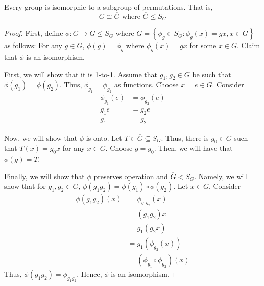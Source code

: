 \begin{theorem}
    Every group is isomorphic to a subgroup of permutations. That is,
    \[
        G \cong \overline{G} \text{ where } \overline{G} \leq S_G
    \]
\end{theorem}

\begin{proof}
    First, define \(\phi: G \to \overline{G} \leq S_G\) where \(\overline{G} = \left\{\phi_g \in S_G : \phi_g(x) = gx, x \in G\right\}\) as follows: For any \(g \in G\), \(\phi(g) = \phi_g\) where \(\phi_g(x) = gx\) for some \(x \in G\). Claim that \(\phi\) is an isomorphism.

    First, we will show that it is 1-to-1. Assume that \(g_1, g_2 \in G\) be such that \(\phi(g_1) = \phi(g_2)\). Thus, \(\phi_{g_1} = \phi_{g_2}\) as functions. Choose \(x = e \in G\). Consider
    \[
    \begin{aligned}
        \phi_{g_1}(e) &= \phi_{g_2}(e) \\
        g_1 e &= g_2 e \\
        g_1 &= g_2
    \end{aligned}
    \]

    Now, we will show that \(\phi\) is onto. Let \(T \in \overline{G} \subseteq S_G\). Thus, there is \(g_0 \in G\) such that \(T(x) = g_0 x\) for any \(x \in G\). Choose \(g = g_0\). Then, we will have that \(\phi(g) = T\).

    Finally, we will show that \(\phi\) preserves operation and \(\overline{G} < S_G\). Namely, we will show that for \(g_1, g_2 \in G\), \(\phi(g_1 g_2) = \phi(g_1) \circ \phi(g_2)\). Let \(x \in G\). Consider
    \[
    \begin{aligned}
        \phi(g_1 g_2)(x) &= \phi_{g_1 g_2}(x) \\
                         &= (g_1 g_2)x \\
                         &= g_1(g_2 x) \\
                         &= g_1(\phi_{g_2}(x)) \\
                         &= (\phi_{g_1} \circ \phi_{g_2}) (x)
    \end{aligned}
    \]
    Thus, \(\phi(g_1 g_2) = \phi_{g_1 g_2}\). Hence, \(\phi\) is an isomorphism.
\end{proof}

